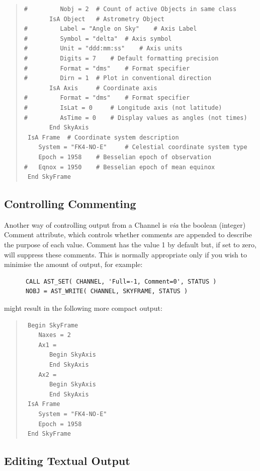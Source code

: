 \documentclass[twoside,11pt]{article}
\newcommand{\htmlref}[2]{#1}
\begin{document}
\begin{quote}
\begin{verbatim}
#         Nobj = 2 	# Count of active Objects in same class
       IsA Object 	# Astrometry Object
#         Label = "Angle on Sky" 	# Axis Label
#         Symbol = "delta" 	# Axis symbol
#         Unit = "ddd:mm:ss" 	# Axis units
#         Digits = 7 	# Default formatting precision
#         Format = "dms" 	# Format specifier
#         Dirn = 1 	# Plot in conventional direction
       IsA Axis 	# Coordinate axis
#         Format = "dms" 	# Format specifier
#         IsLat = 0 	# Longitude axis (not latitude)
#         AsTime = 0 	# Display values as angles (not times)
       End SkyAxis
 IsA Frame 	# Coordinate system description
    System = "FK4-NO-E" 	# Celestial coordinate system type
    Epoch = 1958 	# Besselian epoch of observation
#   Eqnox = 1950 	# Besselian epoch of mean equinox
 End SkyFrame
\end{verbatim}
\normalsize
\end{quote}

\subsection{\label{ss:channelcommenting}Controlling Commenting}

Another way of controlling output from a \htmlref{Channel}{Channel} is {\em{via}} the
boolean (integer) \htmlref{Comment}{Comment} attribute, which controls whether comments
are appended to describe the purpose of each value. Comment has the
value 1 by default but, if set to zero, will suppress these
comments. This is normally appropriate only if you wish to minimise
the amount of output, for example:

\small
\begin{verbatim}
      CALL AST_SET( CHANNEL, 'Full=-1, Comment=0', STATUS )
      NOBJ = AST_WRITE( CHANNEL, SKYFRAME, STATUS )
\end{verbatim}
\normalsize

might result in the following more compact output:

\begin{quote}
\small
\begin{verbatim}
 Begin SkyFrame
    Naxes = 2
    Ax1 =
       Begin SkyAxis
       End SkyAxis
    Ax2 =
       Begin SkyAxis
       End SkyAxis
 IsA Frame
    System = "FK4-NO-E"
    Epoch = 1958
 End SkyFrame
\end{verbatim}
\normalsize
\end{quote}

\subsection{Editing Textual Output}
\end{document}

